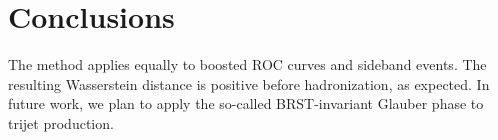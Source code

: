\section{Conclusions}\label{sec:conclusions}

The method applies equally to boosted ROC curves and sideband events.
The resulting Wasserstein distance is positive before hadronization, as
expected. In future work, we plan to apply the so-called BRST-invariant
Glauber phase to trijet production.

